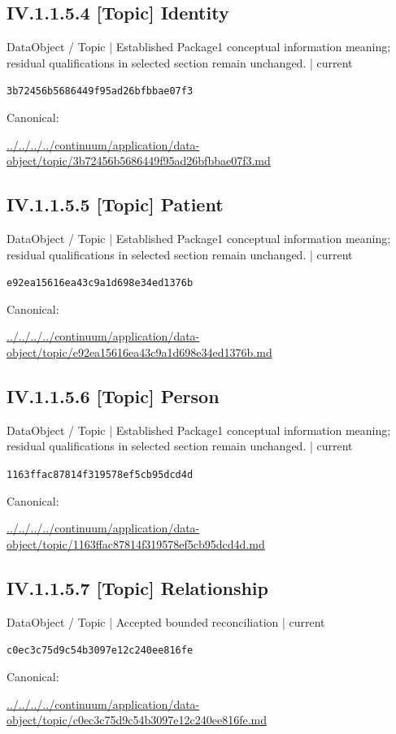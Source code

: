 \documentclass[10pt,a4paper]{article}
\begin{document}
\subsection*{IV.1.1.5.4 [Topic] Identity}
\label{element-3b72456b5686449f95ad26bfbbae07f3}
{\small DataObject / Topic | Established Package1 conceptual information meaning; residual qualifications in selected section remain unchanged. | current}\par
\texttt{3b72456b5686449f95ad26bfbbae07f3}\par
Canonical: \par
{\footnotesize\url{../../../../continuum/application/data-object/topic/3b72456b5686449f95ad26bfbbae07f3.md}}\par
\subsection*{IV.1.1.5.5 [Topic] Patient}
\label{element-e92ea15616ea43c9a1d698e34ed1376b}
{\small DataObject / Topic | Established Package1 conceptual information meaning; residual qualifications in selected section remain unchanged. | current}\par
\texttt{e92ea15616ea43c9a1d698e34ed1376b}\par
Canonical: \par
{\footnotesize\url{../../../../continuum/application/data-object/topic/e92ea15616ea43c9a1d698e34ed1376b.md}}\par
\subsection*{IV.1.1.5.6 [Topic] Person}
\label{element-1163ffac87814f319578ef5cb95dcd4d}
{\small DataObject / Topic | Established Package1 conceptual information meaning; residual qualifications in selected section remain unchanged. | current}\par
\texttt{1163ffac87814f319578ef5cb95dcd4d}\par
Canonical: \par
{\footnotesize\url{../../../../continuum/application/data-object/topic/1163ffac87814f319578ef5cb95dcd4d.md}}\par
\subsection*{IV.1.1.5.7 [Topic] Relationship}
\label{element-c0ec3c75d9c54b3097e12c240ee816fe}
{\small DataObject / Topic | Accepted bounded reconciliation | current}\par
\texttt{c0ec3c75d9c54b3097e12c240ee816fe}\par
Canonical: \par
{\footnotesize\url{../../../../continuum/application/data-object/topic/c0ec3c75d9c54b3097e12c240ee816fe.md}}\par
\end{document}
